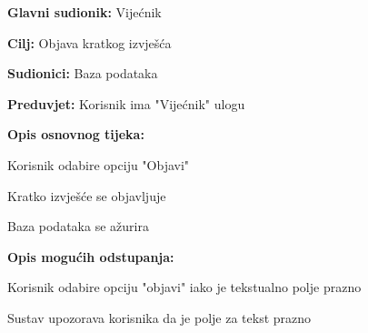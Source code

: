 					\noindent {}
					\begin{packed_item}
	
						\item \textbf{Glavni sudionik: }Vijećnik
						\item  \textbf{Cilj:} Objava kratkog izvješća
						\item  \textbf{Sudionici:} Baza podataka
						\item  \textbf{Preduvjet:} Korisnik ima "Vijećnik" ulogu
						\item  \textbf{Opis osnovnog tijeka:}
						
						\item[] \begin{packed_enum}
	
							\item Korisnik odabire opciju "Objavi" 
							\item Kratko izvješće se objavljuje
							\item Baza podataka se ažurira
							
							
							
							
							
						\end{packed_enum}
						\item  \textbf{Opis mogućih odstupanja:}
						
						\item[] \begin{packed_item}
						\item[2.a] Korisnik odabire opciju "objavi" iako je tekstualno polje prazno
							\item[] \begin{packed_enum}
								
								\item Sustav upozorava korisnika da je polje za tekst prazno
								
							\end{packed_enum}
						\end{packed_item}						
					\end{packed_item}
					\noindent {}
